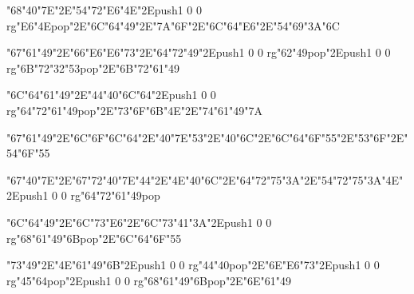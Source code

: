 \centerline{\ipa\char"68\ipa\char"40\ipa\char"7E\ipa\char"2E\ipa\char"54\ipa\char"72\ipa\char"E6\ipa\char"4E\ipa\char"2E\pdfcolorstack\match push{1 0 0 rg}\ipa\char"E6\ipa\char"4E\pdfcolorstack\match pop{}\ipa\char"2E\ipa\char"6C\ipa\char"64\ipa\char"49\ipa\char"2E\ipa\char"7A\ipa\char"6F\ipa\char"2E\ipa\char"6C\ipa\char"64\ipa\char"E6\ipa\char"2E\ipa\char"54\ipa\char"69\ipa\char"3A\ipa\char"6C}\bigskip
\centerline{\ipa\char"67\ipa\char"61\ipa\char"49\ipa\char"2E\ipa\char"66\ipa\char"E6\ipa\char"E6\ipa\char"73\ipa\char"2E\ipa\char"64\ipa\char"72\ipa\char"49\ipa\char"2E\pdfcolorstack\match push{1 0 0 rg}\ipa\char"62\ipa\char"49\pdfcolorstack\match pop{}\ipa\char"2E\pdfcolorstack\match push{1 0 0 rg}\ipa\char"6B\ipa\char"72\ipa\char"32\ipa\char"53\pdfcolorstack\match pop{}\ipa\char"2E\ipa\char"6B\ipa\char"72\ipa\char"61\ipa\char"49}
\vfill\eject
\null\vfill
\centerline{\ipa\char"6C\ipa\char"64\ipa\char"61\ipa\char"49\ipa\char"2E\ipa\char"44\ipa\char"40\ipa\char"6C\ipa\char"64\ipa\char"2E\pdfcolorstack\match push{1 0 0 rg}\ipa\char"64\ipa\char"72\ipa\char"61\ipa\char"49\pdfcolorstack\match pop{}\ipa\char"2E\ipa\char"73\ipa\char"6F\ipa\char"6B\ipa\char"4E\ipa\char"2E\ipa\char"74\ipa\char"61\ipa\char"49\ipa\char"7A}\bigskip
\centerline{\ipa\char"67\ipa\char"61\ipa\char"49\ipa\char"2E\ipa\char"6C\ipa\char"6F\ipa\char"6C\ipa\char"64\ipa\char"2E\ipa\char"40\ipa\char"7E\ipa\char"53\ipa\char"2E\ipa\char"40\ipa\char"6C\ipa\char"2E\ipa\char"6C\ipa\char"64\ipa\char"6F\ipa\char"55\ipa\char"2E\ipa\char"53\ipa\char"6F\ipa\char"2E\ipa\char"54\ipa\char"6F\ipa\char"55}\bigskip
\centerline{\ipa\char"67\ipa\char"40\ipa\char"7E\ipa\char"2E\ipa\char"67\ipa\char"72\ipa\char"40\ipa\char"7E\ipa\char"44\ipa\char"2E\ipa\char"4E\ipa\char"40\ipa\char"6C\ipa\char"2E\ipa\char"64\ipa\char"72\ipa\char"75\ipa\char"3A\ipa\char"2E\ipa\char"54\ipa\char"72\ipa\char"75\ipa\char"3A\ipa\char"4E\ipa\char"2E\pdfcolorstack\match push{1 0 0 rg}\ipa\char"64\ipa\char"72\ipa\char"61\ipa\char"49\pdfcolorstack\match pop{}}
\vfill\eject
\null\vfill
\centerline{\ipa\char"6C\ipa\char"64\ipa\char"49\ipa\char"2E\ipa\char"6C\ipa\char"73\ipa\char"E6\ipa\char"2E\ipa\char"6C\ipa\char"73\ipa\char"41\ipa\char"3A\ipa\char"2E\pdfcolorstack\match push{1 0 0 rg}\ipa\char"68\ipa\char"61\ipa\char"49\ipa\char"6B\pdfcolorstack\match pop{}\ipa\char"2E\ipa\char"6C\ipa\char"64\ipa\char"6F\ipa\char"55}\bigskip
\centerline{\ipa\char"73\ipa\char"49\ipa\char"2E\ipa\char"4E\ipa\char"61\ipa\char"49\ipa\char"6B\ipa\char"2E\pdfcolorstack\match push{1 0 0 rg}\ipa\char"44\ipa\char"40\pdfcolorstack\match pop{}\ipa\char"2E\ipa\char"6E\ipa\char"E6\ipa\char"73\ipa\char"2E\pdfcolorstack\match push{1 0 0 rg}\ipa\char"45\ipa\char"64\pdfcolorstack\match pop{}\ipa\char"2E\pdfcolorstack\match push{1 0 0 rg}\ipa\char"68\ipa\char"61\ipa\char"49\ipa\char"6B\pdfcolorstack\match pop{}\ipa\char"2E\ipa\char"6E\ipa\char"61\ipa\char"49}\bigskip

